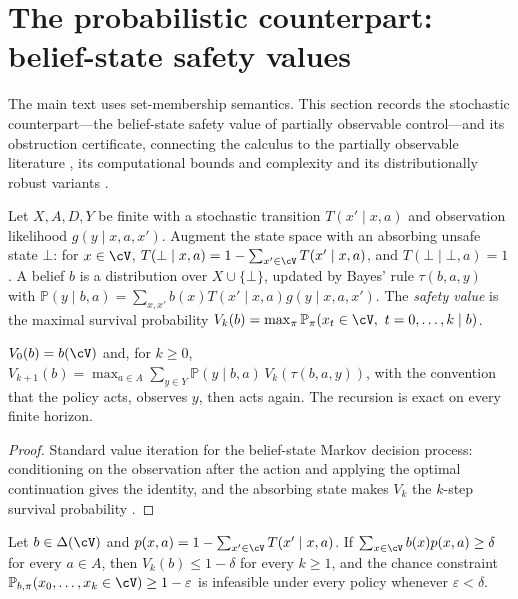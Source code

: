 \section{The probabilistic counterpart: belief-state safety values}\label{S:prob}

The main text uses set-membership semantics. This section records the stochastic counterpart---the belief-state safety value of partially observable control---and its obstruction certificate, connecting the calculus to the partially observable literature \citep{astrom1965,smallwood1973}, its computational bounds and complexity \citep{lovejoy1991,papadimitriou1987} and its distributionally robust variants \citep{nakao2021}.

Let $X,A,D,Y$ be finite with a stochastic transition $T(x'\mid x,a)$ and observation likelihood $g(y\mid x,a,x')$. Augment the state space with an absorbing unsafe state $\bot$: for $x\in\cV$, $T(\bot\mid x,a)=1-\sum_{x'\in\cV}T(x'\mid x,a)$, and $T(\bot\mid\bot,a)=1$. A belief $b$ is a distribution over $X\cup\{\bot\}$, updated by Bayes' rule $\tau(b,a,y)$ with $\mathbb P(y\mid b,a)=\sum_{x,x'}b(x)T(x'\mid x,a)g(y\mid x,a,x')$. The \emph{safety value} is the maximal survival probability $V_k(b)=\max_\pi\mathbb P_\pi(x_t\in\cV,\ t=0,\dots,k\mid b)$.

\begin{theorem}\label{thm:pomdp}
$V_0(b)=b(\cV)$ and, for $k\ge0$, $V_{k+1}(b)=\max_{a\in A}\sum_{y\in Y}\mathbb P(y\mid b,a)\,V_k(\tau(b,a,y))$, with the convention that the policy acts, observes $y$, then acts again. The recursion is exact on every finite horizon.
\end{theorem}

\begin{proof}
Standard value iteration for the belief-state Markov decision process: conditioning on the observation after the action and applying the optimal continuation gives the identity, and the absorbing state makes $V_k$ the $k$-step survival probability \citep{smallwood1973}.
\end{proof}

\begin{proposition}\label{prop:chance}
Let $b\in\Delta(\cV)$ and $p(x,a)=1-\sum_{x'\in\cV}T(x'\mid x,a)$. If $\sum_{x\in\cV}b(x)p(x,a)\ge\delta$ for every $a\in A$, then $V_k(b)\le1-\delta$ for every $k\ge1$, and the chance constraint $\mathbb P_{b,\pi}(x_0,\dots,x_k\in\cV)\ge1-\varepsilon$ is infeasible under every policy whenever $\varepsilon<\delta$.
\end{proposition}


